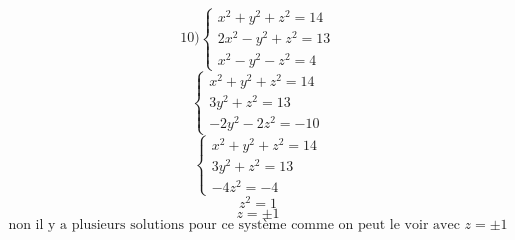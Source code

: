 \documentclass{article}
\begin{document}
\[
\text{10)}
\begin{cases}
x^2 + y^2 + z^2 = 14 \\
2x^2 - y^2 + z^2 = 13 \\
x^2 - y^2 - z^2 = 4
\end{cases}
\]
\[
\begin{cases}
x^2 + y^2 + z^2 = 14 \\
3y^2 + z^2 = 13 \\
-2y^2 - 2z^2 = -10
\end{cases}
\]
\[
\begin{cases}
x^2 + y^2 + z^2 = 14 \\
3y^2 + z^2 = 13 \\
-4z^2 = -4
\end{cases}
\]
\[
z^2 = 1
\]
\[
z = \pm 1
\]
\[
\text{non il y a plusieurs solutions pour ce système comme on peut le voir avec } z = \pm 1
\]
\end{document}
